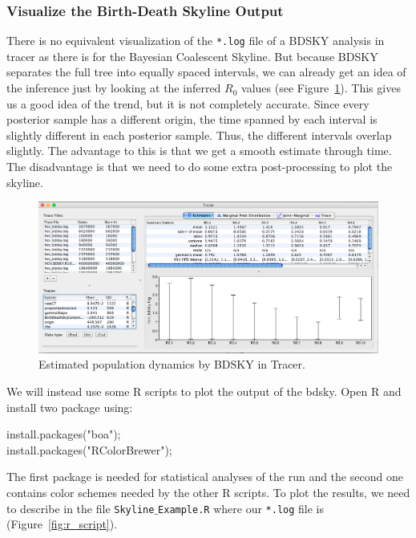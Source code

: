 \documentclass[11pt]{article}
\begin{document}
\subsubsection{Visualize the Birth-Death Skyline Output}

There is no equivalent visualization of the \texttt{*.log} file of a BDSKY analysis in tracer as there is for the Bayesian Coalescent Skyline. But because BDSKY separates the full tree into equally spaced intervals, we can already get an idea of the inference just by looking at the inferred $R_{0}$ values (see Figure~\ref{fig:bdsky_dynamics}). This gives us a good idea of the trend, but it is not completely accurate. Since every posterior sample has a different origin, the time spanned by each interval is slightly different in each posterior sample. Thus, the different intervals overlap slightly. The advantage to this is that we get a smooth estimate through time. The disadvantage is that we need to do some extra post-processing to plot the skyline.

\begin{figure}[h!]
\centering
\includegraphics[width=\textwidth]{figures/bdsky_tracer.png}
\caption{\small Estimated population dynamics by BDSKY in Tracer.}
\label{fig:bdsky_dynamics}
\end{figure}


We will instead use some R scripts to plot the output of the bdsky. 
Open R and install two package using:
\begin{framed}
install.packages("boa");\\
install.packages("RColorBrewer");\\
\end{framed}

The first package is needed for statistical analyses of the run and the second one contains color schemes needed by the other R scripts. 
To plot the results, we need to describe in the file \texttt{Skyline$\_$Example.R} where our \texttt{*.log} file is (Figure~\ref{fig:r_script}).
\end{document}
